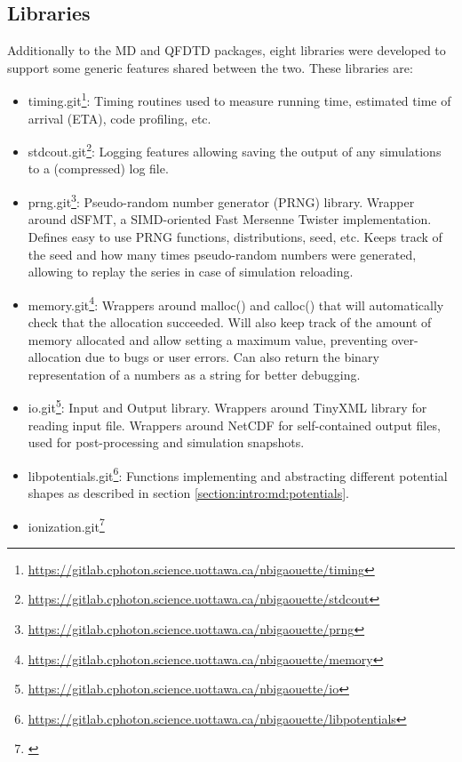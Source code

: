 \subsection{Libraries}

Additionally to the MD and QFDTD packages, eight libraries were developed to
support some generic features shared between the two. These libraries are:
\begin{itemize}
\item timing.git\footnote{ \url{
    https://gitlab.cphoton.science.uottawa.ca/nbigaouette/timing}}:
    Timing routines used to measure running time, estimated time of arrival
    (ETA), code profiling, etc.
\item stdcout.git\footnote{ \url{
    https://gitlab.cphoton.science.uottawa.ca/nbigaouette/stdcout}}:
    Logging features allowing saving the output of any simulations to a
    (compressed) log file.
\item prng.git\footnote{ \url{
    https://gitlab.cphoton.science.uottawa.ca/nbigaouette/prng}}:
    Pseudo-random number generator (PRNG) library. Wrapper around
    dSFMT\cite{prng2009}, a SIMD-oriented Fast Mersenne Twister implementation.
    Defines easy to use PRNG functions, distributions, seed, etc. Keeps track of
    the seed and how many times pseudo-random numbers were generated, allowing
    to replay the series in case of simulation reloading.
\item memory.git\footnote{ \url{
    https://gitlab.cphoton.science.uottawa.ca/nbigaouette/memory}}:
    Wrappers around malloc() and calloc() that will automatically check that
    the allocation succeeded. Will also keep track of the amount of
    memory allocated and allow setting a maximum value, preventing
    over-allocation due to bugs or user errors. Can also return the binary
    representation of a numbers as a string for better debugging.
\item io.git\footnote{ \url{
    https://gitlab.cphoton.science.uottawa.ca/nbigaouette/io}}:
    Input and Output library. Wrappers around TinyXML library\cite{tinyxml} for
    reading input file. Wrappers around NetCDF\cite{netcdf} for self-contained
    output files, used for post-processing and simulation snapshots.
\item libpotentials.git\footnote{ \url{
    https://gitlab.cphoton.science.uottawa.ca/nbigaouette/libpotentials}}:
    Functions implementing and abstracting different potential shapes as
    described in section \ref{section:intro:md:potentials}.
\item ionization.git\footnote{ \url{
}}
\end{itemize}
